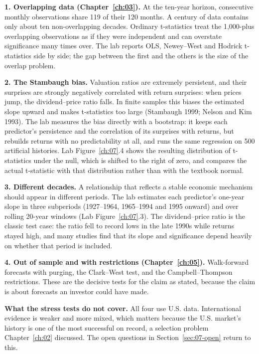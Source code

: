 \textbf{1. Overlapping data (Chapter~\ref{ch:03}).} At the ten-year horizon, consecutive monthly observations share 119 of their 120 months. A century of data contains only about ten non-overlapping decades. Ordinary t-statistics treat the 1,000-plus overlapping observations as if they were independent and can overstate significance many times over. The lab reports OLS, Newey--West and Hodrick t-statistics side by side; the gap between the first and the others is the size of the overlap problem.

\textbf{2. The Stambaugh bias.} Valuation ratios are extremely persistent, and their surprises are strongly negatively correlated with return surprises: when prices jump, the dividend--price ratio falls. In finite samples this biases the estimated slope upward and makes t-statistics too large (Stambaugh 1999; Nelson and Kim 1993). The lab measures the bias directly with a bootstrap: it keeps each predictor's persistence and the correlation of its surprises with returns, but rebuilds returns with no predictability at all, and runs the same regression on 500 artificial histories. Lab Figure~\ref{ch:07}.4 shows the resulting distribution of t-statistics under the null, which is shifted to the right of zero, and compares the actual t-statistic with that distribution rather than with the textbook normal.

\textbf{3. Different decades.} A relationship that reflects a stable economic mechanism should appear in different periods. The lab estimates each predictor's one-year slope in three subperiods (1927--1964, 1965--1994 and 1995 onward) and over rolling 20-year windows (Lab Figure~\ref{ch:07}.3). The dividend--price ratio is the classic test case: the ratio fell to record lows in the late 1990s while returns stayed high, and many studies find that its slope and significance depend heavily on whether that period is included.

\textbf{4. Out of sample and with restrictions (Chapter~\ref{ch:05}).} Walk-forward forecasts with purging, the Clark--West test, and the Campbell--Thompson restrictions. These are the decisive tests for the claim as stated, because the claim is about forecasts an investor could have made.

\textbf{What the stress tests do not cover.} All four use U.S. data. International evidence is weaker and more mixed, which matters because the U.S. market's history is one of the most successful on record, a selection problem Chapter~\ref{ch:02} discussed. The open questions in Section~\ref{sec:07-open} return to this.

